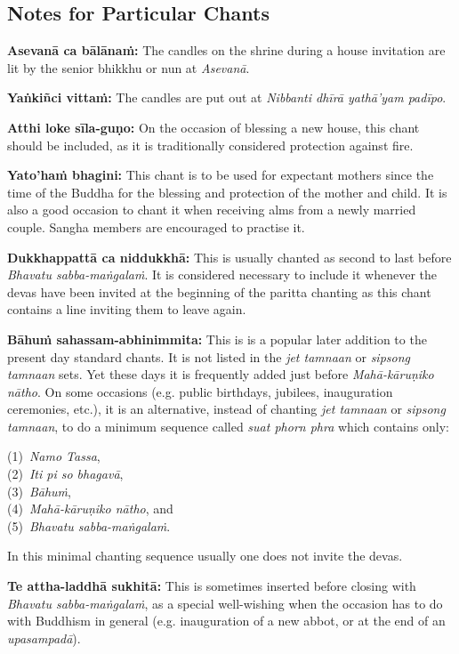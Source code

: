 \subsection*{Notes for Particular Chants}

\textbf{Asevanā ca bālānaṁ:} The candles on the shrine during a house invitation
are lit by the senior bhikkhu or nun at \emph{Asevanā}.

\textbf{Yaṅkiñci vittaṁ:} The candles are put out at \emph{Nibbanti
  dhīrā yathā'yam padīpo}.

\textbf{Atthi loke sīla-guṇo:} On the occasion of blessing a new house, this
chant should be included, as it is traditionally considered protection against
fire.

\textbf{Yato'haṁ bhagini:} This chant is to be used for expectant mothers since
the time of the Buddha for the blessing and protection of the mother and child.
It is also a good occasion to chant it when receiving alms from a newly married
couple. Sangha members are encouraged to practise it.

\textbf{Dukkhappattā ca niddukkhā:} This is usually chanted as second to last
before \emph{Bhavatu sabba-maṅgalaṁ}. It is considered necessary to include it
whenever the devas have been invited at the beginning of the paritta chanting
as this chant contains a line inviting them to leave again.

\textbf{Bāhuṁ sahassam-abhinimmita:} This is is a popular later addition to the
present day standard chants. It is not listed in the \emph{jet tamnaan} or
\emph{sipsong tamnaan} sets. Yet these days it is frequently added just before
\emph{Mahā-kāruṇiko nātho}. On some occasions (e.g. public birthdays, jubilees,
inauguration ceremonies, etc.), it is an alternative, instead of chanting
\emph{jet tamnaan} or \emph{sipsong tamnaan}, to do a minimum sequence called
\emph{suat phorn phra} which contains only:

(1)~\emph{Namo Tassa},\\
(2)~\emph{Iti pi so bhagavā},\\
(3)~\emph{Bāhuṁ},\\
(4)~\emph{Mahā-kāruṇiko nātho}, and\\
(5)~\emph{Bhavatu sabba-maṅgalaṁ}.

In this minimal chanting sequence usually one does not invite the devas.

\textbf{Te attha-laddhā sukhitā:} This is sometimes inserted before closing with
\emph{Bhavatu sabba-maṅgalaṁ}, as a special well-wishing when the occasion has
to do with Buddhism in general (e.g. inauguration of a new abbot, or at the end
of an \emph{upasampadā}).

